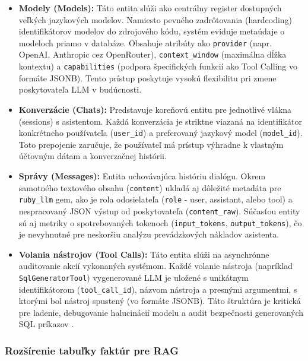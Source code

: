 \begin{itemize}
	\item \textbf{Modely (Models):} Táto entita slúži ako centrálny register
		dostupných veľkých jazykových modelov. Namiesto pevného zadrôtovania (hardcoding)
		identifikátorov modelov do zdrojového kódu, systém eviduje metaúdaje o
		modeloch priamo v databáze. Obsahuje atribúty ako \texttt{provider} (napr.
		OpenAI, Anthropic cez OpenRouter), \texttt{context\_window} (maximálna dĺžka kontextu)
		a \texttt{capabilities} (podpora špecifických funkcií ako Tool Calling vo
		formáte JSONB). Tento prístup poskytuje vysokú flexibilitu pri zmene
		poskytovateľa LLM v budúcnosti.

	\item \textbf{Konverzácie (Chats):} Predstavuje koreňovú entitu pre jednotlivé
		vlákna (sessions) s asistentom. Každá konverzácia je striktne viazaná na identifikátor
		konkrétneho používateľa (\texttt{user\_id}) a preferovaný jazykový model (\texttt{model\_id}).
		Toto prepojenie zaručuje, že používateľ má prístup výhradne k vlastným účtovným
		dátam a konverzačnej histórii.

	\item \textbf{Správy (Messages):} Entita uchovávajúca históriu dialógu. Okrem samotného
		textového obsahu (\texttt{content}) ukladá aj dôležité metadáta pre \texttt{ruby\_llm}
		gem, ako je rola odosielateľa (\texttt{role} - user, assistant, alebo tool) a
		nespracovaný JSON výstup od poskytovateľa (\texttt{content\_raw}). Súčasťou entity
		sú aj metriky o spotrebovaných tokenoch (\texttt{input\_tokens}, \texttt{output\_tokens}),
		čo je nevyhnutné pre neskoršiu analýzu prevádzkových nákladov asistenta.

	\item \textbf{Volania nástrojov (Tool Calls):} Táto entita slúži na
		asynchrónne auditovanie akcií vykonaných systémom. Každé volanie nástroja (napríklad
		\texttt{SqlGeneratorTool}) vygenerované LLM je uložené s unikátnym
		identifikátorom (\texttt{tool\_call\_id}), názvom nástroja a presnými
		argumentmi, s ktorými bol nástroj spustený (vo formáte JSONB). Táto
		štruktúra je kritická pre ladenie, debugovanie halucinácií modelu a audit bezpečnosti
		generovaných SQL príkazov \cite{zhao2023}.
\end{itemize}

\subsubsection{Rozšírenie tabuľky faktúr pre RAG}


